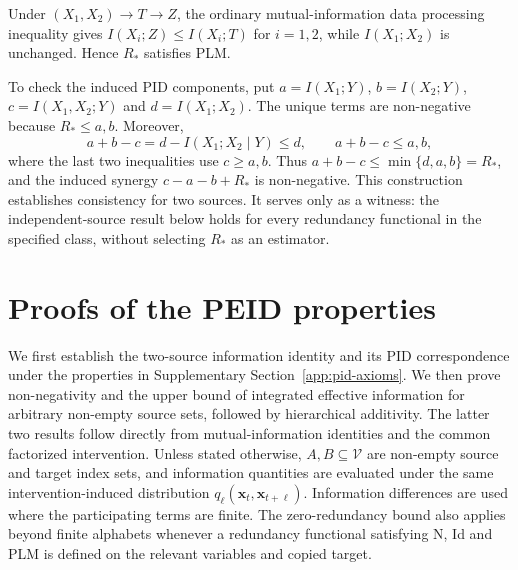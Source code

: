 Under $(X_1,X_2)\rightarrow T\rightarrow Z$, the ordinary mutual-information data processing inequality gives $I(X_i;Z)\leq I(X_i;T)$ for $i=1,2$, while $I(X_1;X_2)$ is unchanged. Hence $R_*$ satisfies PLM.

To check the induced PID components, put $a=I(X_1;Y)$, $b=I(X_2;Y)$, $c=I(X_1,X_2;Y)$ and $d=I(X_1;X_2)$. The unique terms are non-negative because $R_*\leq a,b$. Moreover,
\begin{equation}
a+b-c=d-I(X_1;X_2\mid Y)\leq d,
\qquad a+b-c\leq a,b,
\label{eq:pid_witness_lower_bound}
\end{equation}
where the last two inequalities use $c\geq a,b$. Thus $a+b-c\leq\min\{d,a,b\}=R_*$, and the induced synergy $c-a-b+R_*$ is non-negative. This construction establishes consistency for two sources. It serves only as a witness: the independent-source result below holds for every redundancy functional in the specified class, without selecting $R_*$ as an estimator.


\section{Proofs of the PEID properties}
\label{app:theoretical_proofs}

We first establish the two-source information identity and its PID correspondence under the properties in Supplementary Section~\ref{app:pid-axioms}. We then prove non-negativity and the upper bound of integrated effective information for arbitrary non-empty source sets, followed by hierarchical additivity. The latter two results follow directly from mutual-information identities and the common factorized intervention. Unless stated otherwise, $A,B\subseteq\mathcal{V}$ are non-empty source and target index sets, and information quantities are evaluated under the same intervention-induced distribution $q_\ell(\boldsymbol{x}_t,\boldsymbol{x}_{t+\ell})$. Information differences are used where the participating terms are finite. The zero-redundancy bound also applies beyond finite alphabets whenever a redundancy functional satisfying N, Id and PLM is defined on the relevant variables and copied target.

